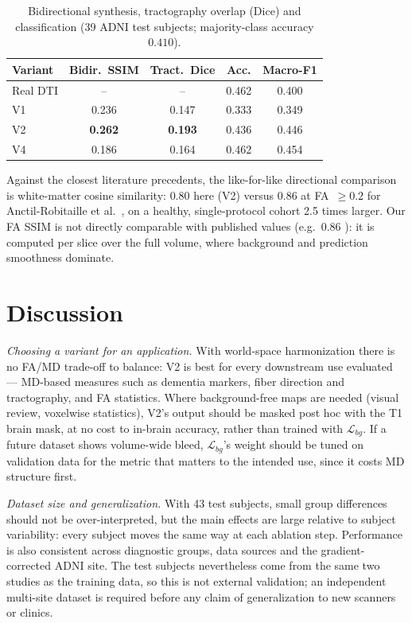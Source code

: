 \documentclass[conference,compsoc]{IEEEtran}
\begin{document}
\begin{table}[t]
\centering
\small
\setlength{\tabcolsep}{4pt}
\caption{Bidirectional synthesis, tractography overlap (Dice) and classification (39 ADNI test subjects; majority-class accuracy $0.410$).}
\label{tab:other_results}
\begin{tabular}{lcccc}
\toprule
\textbf{Variant} & \textbf{Bidir.\ SSIM} & \textbf{Tract.\ Dice} & \textbf{Acc.} & \textbf{Macro-F1} \\
\midrule
Real DTI & -- & -- & 0.462 & 0.400 \\
V1 & 0.236 & 0.147 & 0.333 & 0.349 \\
V2 & \textbf{0.262} & \textbf{0.193} & 0.436 & 0.446 \\
V4 & 0.186 & 0.164 & 0.462 & 0.454 \\
\bottomrule
\end{tabular}
\end{table}

Against the closest literature precedents, the like-for-like directional comparison is white-matter cosine similarity: $0.80$ here (V2) versus $0.86$ at FA~$\geq0.2$ for Anctil-Robitaille et al.\ \cite{paper1}, on a healthy, single-protocol cohort 2.5 times larger. Our FA SSIM is not directly comparable with published values (e.g.\ $0.86$ \cite{paper10}): it is computed per slice over the full volume, where background and prediction smoothness dominate.

\section{Discussion}
\label{sec:discussion}
\textit{Choosing a variant for an application.} With world-space harmonization there is no FA/MD trade-off to balance: V2 is best for every downstream use evaluated --- MD-based measures such as dementia markers, fiber direction and tractography, and FA statistics. Where background-free maps are needed (visual review, voxelwise statistics), V2's output should be masked post hoc with the T1 brain mask, at no cost to in-brain accuracy, rather than trained with $\mathcal{L}_{bg}$. If a future dataset shows volume-wide bleed, $\mathcal{L}_{bg}$'s weight should be tuned on validation data for the metric that matters to the intended use, since it costs MD structure first.

\textit{Dataset size and generalization.} With 43 test subjects, small group differences should not be over-interpreted, but the main effects are large relative to subject variability: every subject moves the same way at each ablation step. Performance is also consistent across diagnostic groups, data sources and the gradient-corrected ADNI site. The test subjects nevertheless come from the same two studies as the training data, so this is not external validation; an independent multi-site dataset is required before any claim of generalization to new scanners or clinics.
\end{document}
